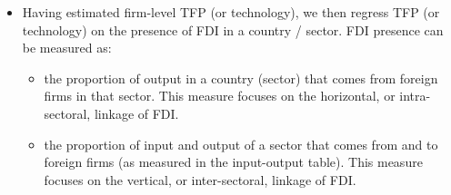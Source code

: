 \begin{itemize}
\item Having estimated firm-level TFP (or technology), we then regress TFP (or technology) on the presence of FDI in a country / sector. FDI presence can be measured as:
\begin{itemize}
\item the proportion of output in a country (sector) that comes from foreign firms in that sector. This measure focuses on the horizontal, or intra-sectoral, linkage of FDI.
\item the proportion of input and output of a sector that comes from and to foreign firms (as measured in the input-output table). This measure focuses on the vertical, or inter-sectoral, linkage of FDI.
\end{itemize}
\end{itemize}

